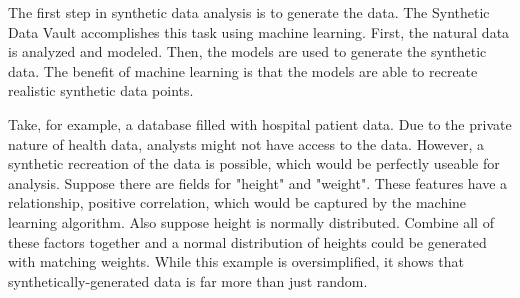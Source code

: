 The first step in synthetic data analysis is to generate the data. The
Synthetic Data Vault accomplishes this task using machine learning. First,
the natural data is analyzed and modeled. Then, the models are used to
generate the synthetic data. The benefit of machine learning is that the
models are able to recreate realistic synthetic data points.

Take, for example, a database filled with hospital patient data. Due to
the private nature of health data, analysts might not have access to the
data. However, a synthetic recreation of the data is possible, which would
be perfectly useable for analysis. Suppose there are fields for "height" and
"weight". These features have a relationship, positive correlation, which
would be captured by the machine learning algorithm.\cite{} Also suppose
height is normally distributed. Combine all of these factors together and a
normal distribution of heights could be generated with matching weights. While
this example is oversimplified, it shows that synthetically-generated data
is far more than just random.




